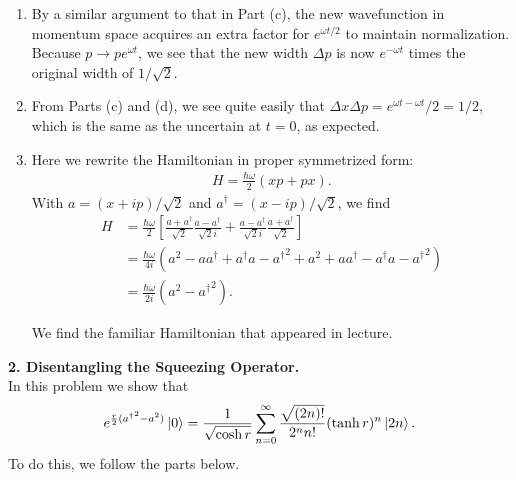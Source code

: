 \documentclass{article}
\theoremstyle{definition}
\newcommand{\f}[2]{\frac{#1}{#2}}
\newcommand{\lb}{\left[}
\newcommand{\rb}{\right]}
\begin{document}
\begin{enumerate}[label=(\alph*)]
\item By a similar argument to that in Part (c), the new wavefunction in momentum space acquires an extra factor for $e^{\omega t/2}$ to maintain normalization. Because $p \to p e^{\omega t}$, we see that the new width $\Delta p$ is now $e^{-\omega t}$ times the original width of $1/\sqrt{2}$.

\item From Parts (c) and (d), we see quite easily that $\Delta x \Delta p = e^{\omega t - \omega t}/2 = 1/2$, which is the same as the uncertain at $t=0$, as expected. 

\item Here we rewrite the Hamiltonian in proper symmetrized form:
\begin{align*}
H = \f{\hbar \omega}{2} (xp + px).
\end{align*} 
With $a = (x+ip)/\sqrt{2}$ and $a^\dagger = (x - ip)/\sqrt{2}$, we find 
\begin{align*}
H 
&= \f{\hbar \omega}{2} \lb \f{a + a^\dagger}{\sqrt{2}} \f{ a - a^\dagger }{\sqrt{2} i} + \f{a - a^\dagger}{\sqrt{2} i} \f{a+a^\dagger}{\sqrt{2}} \rb \\
&= \f{\hbar \omega}{4i} (  a^2 - aa^\dagger + a^\dagger a - {a^\dagger}^2+ a^2 + aa^\dagger - a^\dagger a -  {a^\dagger}^2 ) \\
&= \f{\hbar \omega}{2i} (a^2 - {a^\dagger}^2).
\end{align*}

We find the familiar Hamiltonian that appeared in lecture. 

\end{enumerate}



\noindent \textbf{2. Disentangling the Squeezing Operator.} \\

\noindent In this problem we show that
\begin{align*}
e^{\f{r}{2} ( {a^\dagger}^2 - a^2)}  \ket{0} = \f{1}{\sqrt{\cosh r}} \sum_{n=0}^\infty  \f{\sqrt{(2n)!}}{2^n n!} (\tanh r)^n \ket{2n}.
\end{align*}
To do this, we follow the parts below. 
\end{document}
